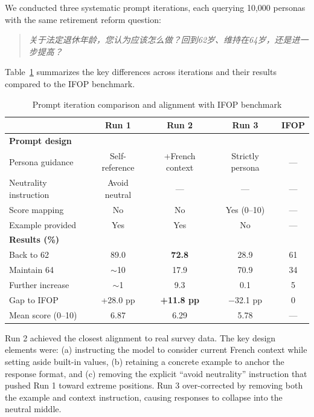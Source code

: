 \documentclass[11pt,a4paper]{article}
\begin{document}
We conducted three systematic prompt iterations, each querying 10,000 personas with the same retirement reform question:

\begin{quote}
    \textit{关于法定退休年龄，您认为应该怎么做？回到62岁、维持在64岁，还是进一步提高？}
\end{quote}

Table~\ref{tab:prompt_iterations} summarizes the key differences across iterations and their results compared to the IFOP benchmark.

\begin{table}[H]
    \centering
    \caption{Prompt iteration comparison and alignment with IFOP benchmark}
    \label{tab:prompt_iterations}
    \begin{tabular}{@{}lcccc@{}}
        \toprule
        & \textbf{Run 1} & \textbf{Run 2} & \textbf{Run 3} & \textbf{IFOP} \\
        \midrule
        \textbf{Prompt design} & & & & \\
        \quad Persona guidance & Self-reference & +French context & Strictly persona & --- \\
        \quad Neutrality instruction & Avoid neutral & --- & --- & --- \\
        \quad Score mapping & No & No & Yes (0--10) & --- \\
        \quad Example provided & Yes & Yes & No & --- \\
        \midrule
        \textbf{Results (\%)} & & & & \\
        \quad Back to 62 & 89.0 & \textbf{72.8} & 28.9 & 61 \\
        \quad Maintain 64 & $\sim$10 & 17.9 & 70.9 & 34 \\
        \quad Further increase & $\sim$1 & 9.3 & 0.1 & 5 \\
        \midrule
        \quad Gap to IFOP & +28.0 pp & \textbf{+11.8 pp} & $-$32.1 pp & 0 \\
        \quad Mean score (0--10) & 6.87 & 6.29 & 5.78 & --- \\
        \bottomrule
    \end{tabular}
\end{table}

Run 2 achieved the closest alignment to real survey data. The key design elements were: (a) instructing the model to consider current French context while setting aside built-in values, (b) retaining a concrete example to anchor the response format, and (c) removing the explicit ``avoid neutrality'' instruction that pushed Run 1 toward extreme positions. Run 3 over-corrected by removing both the example and context instruction, causing responses to collapse into the neutral middle.
\end{document}
